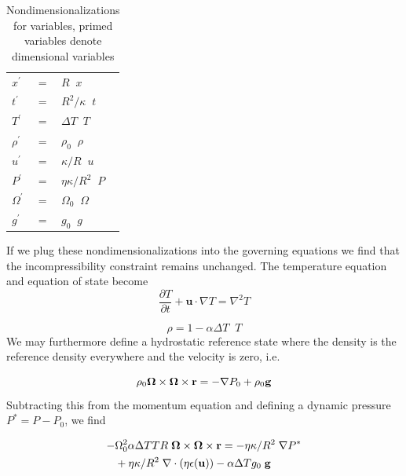 \documentclass[extra,mreferee]{gji}
\begin{document}
\begin{table}
\centering
\caption{Nondimensionalizations for variables, primed variables denote dimensional variables}
\label{tab:nondim_convert}
\begin{tabular}{@{}lll}
$x^\prime$ &=& $R \;\; x$ \\
$t^\prime$ &=& $R^2/\kappa \;\; t$ \\
$T^\prime$ &=& $\Delta T \;\; T$ \\
$\rho^\prime$ &=& $\rho_0 \;\; \rho$\\
$u^\prime$ &=& $\kappa/R \;\; u$ \\
$P^\prime$ &=& $\eta \kappa/R^2 \;\; P$ \\
$\Omega^\prime$ &=& $\Omega_0 \;\; \Omega$ \\
$g^\prime$ &=& $g_0 \;\; g$
\end{tabular}
\end{table}

If we plug these nondimensionalizations into the governing equations we find that the incompressibility constraint remains unchanged.  
The temperature equation and equation of state become
\begin{equation}
\frac{\partial T}{\partial t} + \mathbf{u} \cdot \nabla T = \nabla^2 T
\end{equation}

\begin{equation}
\rho = 1 - \alpha \Delta T \;\;  T
\end{equation}
We may furthermore define a hydrostatic reference state where the density is the reference density everywhere and the velocity is zero, i.e.

\begin{equation}
 \rho_0 \mitbf{\Omega} \times \mitbf{\Omega} \times \mathbf{r}= - \nabla P_0 + \rho_0 \mathbf{g}
\end{equation}
Subtracting this from the momentum equation and defining a dynamic pressure $P^* = P - P_0$, we find

\begin{equation}
\begin{aligned}
 - & \Omega_0^2  \alpha  \Delta T T R \; \mitbf{\Omega} \times \mitbf{\Omega} \times \mathbf{r} = - \eta \kappa / R^2 \; \nabla P^* \\ 
&+ \eta \kappa / R^2 \; \nabla \cdot \left( \eta \epsilon (\mathbf{u}) \right) - \alpha \Delta T g_0 \; \mathbf{g}
\end{aligned}
\end{equation}
\end{document}

